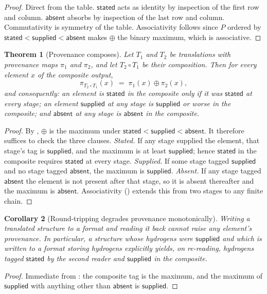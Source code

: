\documentclass[11pt,twocolumn,a4paper]{article}
\theoremstyle{msthm}
\newtheorem{theorem}{Theorem}[section]
\newtheorem{corollary}[theorem]{Corollary}
\theoremstyle{definition}
\theoremstyle{remark}
\newcommand{\Prov}{\pi}
\newcommand{\stated}{\textsf{stated}}
\newcommand{\supplied}{\textsf{supplied}}
\newcommand{\absent}{\textsf{absent}}
\begin{document}
\begin{proof}
Direct from the table. $\stated$ acts as identity by inspection of the
first row and column. $\absent$ absorbs by inspection of the last row
and column. Commutativity is symmetry of the table. Associativity
follows since $P$ ordered by $\stated<\supplied<\absent$ makes $\oplus$
the binary maximum, which is associative.
\end{proof}

\begin{theorem}[Provenance composes]
\label{thm:prov-compose}
Let $T_1$ and $T_2$ be translations with provenance maps $\Prov_1$ and
$\Prov_2$, and let $T_2\circ T_1$ be their composition. Then for every
element $x$ of the composite output,
\[
\Prov_{T_2\circ T_1}(x)\;=\;\Prov_1(x)\oplus\Prov_2(x),
\]
and consequently: an element is $\stated$ in the composite only if it
was $\stated$ at every stage; an element $\supplied$ at any stage is
$\supplied$ or worse in the composite; and $\absent$ at any stage is
$\absent$ in the composite.
\end{theorem}

\begin{proof}
By , $\oplus$ is the maximum under
$\stated<\supplied<\absent$. It therefore suffices to check the three
clauses. \emph{Stated.} If any stage supplied the element, that stage's
tag is $\supplied$, and the maximum is at least $\supplied$; hence
$\stated$ in the composite requires $\stated$ at every stage.
\emph{Supplied.} If some stage tagged $\supplied$ and no stage tagged
$\absent$, the maximum is $\supplied$. \emph{Absent.} If any stage
tagged $\absent$ the element is not present after that stage, so it is
absent thereafter and the maximum is $\absent$. Associativity
() extends this from two stages to any finite chain.
\end{proof}

\begin{corollary}[Round-tripping degrades provenance monotonically]
\label{cor:roundtrip}
Writing a translated structure to a format and reading it back cannot
raise any element's provenance. In particular, a structure whose
hydrogens were $\supplied$ and which is written to a format storing
hydrogens explicitly yields, on re-reading, hydrogens tagged
$\stated$ by the second reader and $\supplied$ in the composite.
\end{corollary}

\begin{proof}
Immediate from : the composite tag is the
maximum, and the maximum of $\supplied$ with anything other than
$\absent$ is $\supplied$.
\end{proof}
\end{document}
